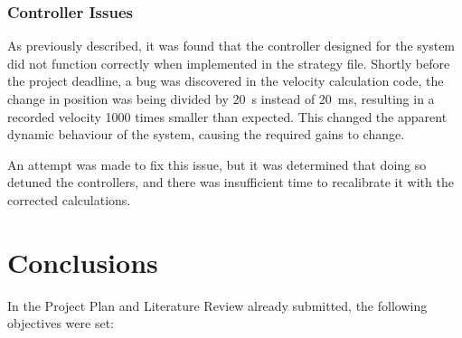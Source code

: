 \documentclass[10pt]{article}
\begin{document}
\subsubsection{Controller Issues}

As previously described, it was found that the controller designed for the
system did not function correctly when implemented in the strategy file. 
Shortly before the project deadline, a bug was discovered in the velocity
calculation code, the change in position was being divided by \SI{20}{\second}
instead of \SI{20}{\milli\second}, resulting in a recorded velocity 1000 times
smaller than expected.  This changed the apparent dynamic behaviour of the
system, causing the required gains to change.

An attempt was made to fix this issue, but it was determined that doing so
detuned the controllers, and there was insufficient time to recalibrate it with
the corrected calculations.

\section{Conclusions}

In the Project Plan and Literature Review already submitted, the following
objectives were set:
\end{document}
